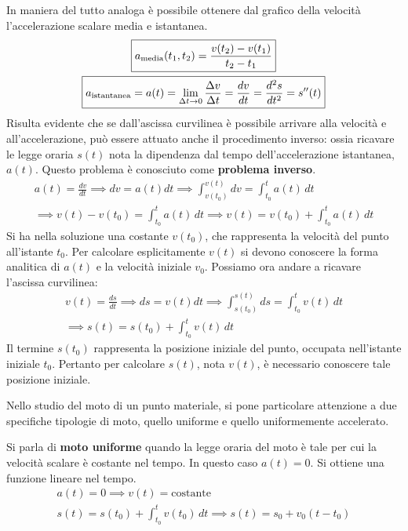 \documentclass[10pt,a4paper]{book}
\begin{document}
In maniera del tutto analoga è possibile ottenere dal grafico della velocità l'accelerazione scalare media e istantanea.
\begin{gather}
	\boxed{a_\textup{media} (t_1, t_2)= \frac{v(t_2)-v(t_1)}{t_2 - t_1}} \\
	\boxed{a_\textup{istantanea}=a(t)=\lim_{\Delta t \to 0} \frac{\Delta v} {\Delta t} =\frac{dv}{dt}=\frac{d^2s}{dt^2}=s''(t)}
\end{gather}
Risulta evidente che se dall'ascissa curvilinea è possibile arrivare alla velocità e all'accelerazione, può essere attuato anche il procedimento inverso: ossia ricavare le legge oraria $s(t)$ nota la dipendenza dal tempo dell'accelerazione istantanea, $a(t)$. Questo problema è conosciuto come \textbf{problema inverso}.
\begin{gather*}
	a(t)=\frac{dv}{dt} \implies dv=a(t) dt \implies \int^{v(t)}_{v(t_0)} dv = \int^t_{t_0} a(t)\,dt \\
	\implies v(t)-v(t_0)=\int^t_{t_0} a(t)\,dt \implies v(t) = v(t_0)+\int^t_{t_0} a(t)\,dt
\end{gather*}
Si ha nella soluzione una costante $v(t_0)$, che rappresenta la velocità del punto all'istante $t_0$. Per calcolare esplicitamente $v(t)$ si devono conoscere la forma analitica di $a(t)$ e la velocità iniziale $v_0$.
Possiamo ora andare a ricavare l'ascissa curvilinea:
\begin{gather*}
	v(t)=\frac{ds}{dt} \implies ds=v(t) dt \implies \int^{s(t)}_{s(t_0)} ds = \int^t_{t_0} v(t)\,dt \\
	\implies s(t)=s(t_0)+\int^t_{t_0} v(t) \,dt
\end{gather*}
Il termine $s(t_0)$ rappresenta la posizione iniziale del punto, occupata nell'istante iniziale $t_0$. Pertanto per calcolare $s(t)$, nota $v(t)$, è necessario conoscere tale posizione iniziale.

Nello studio del moto di un punto materiale, si pone particolare attenzione a due specifiche tipologie di moto, quello uniforme e quello uniformemente accelerato.

Si parla di \textbf{moto uniforme} quando la legge oraria del moto è tale per cui la velocità scalare è costante nel tempo. In questo caso $a(t)=0$. Si ottiene una funzione lineare nel tempo.
\begin{gather*}
	a(t)=0 \implies v(t)=\text{costante} \\
	s(t)=s(t_0)+ \int^t_{t_0} v(t_0) \,dt \implies s(t)=s_0 + v_0 (t - t_0)
\end{gather*}
\end{document}
